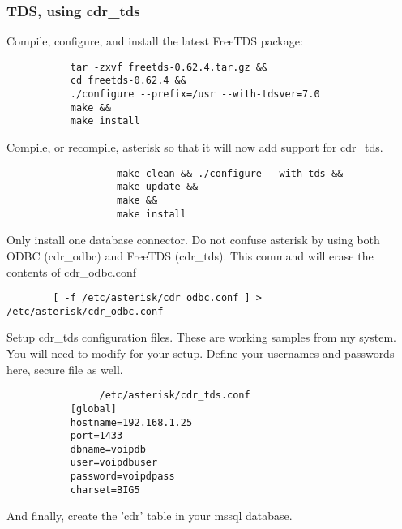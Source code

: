 \subsubsection{TDS, using cdr\_tds}
		Compile, configure, and install the latest FreeTDS package:
\begin{astlisting}
\begin{verbatim}
		   tar -zxvf freetds-0.62.4.tar.gz &&
		   cd freetds-0.62.4 &&
		   ./configure --prefix=/usr --with-tdsver=7.0
		   make &&
		   make install
\end{verbatim}
\end{astlisting}
                Compile, or recompile, asterisk so that it will now add support
                for cdr\_tds.
\begin{astlisting}
\begin{verbatim}
                   make clean && ./configure --with-tds &&
                   make update &&
                   make &&
                   make install
\end{verbatim}
\end{astlisting}
                Only install one database connector.  Do not confuse asterisk
                by using both ODBC (cdr\_odbc) and FreeTDS (cdr\_tds).
                This command will erase the contents of cdr\_odbc.conf
\begin{astlisting}
\begin{verbatim}
		[ -f /etc/asterisk/cdr_odbc.conf ] > /etc/asterisk/cdr_odbc.conf
\end{verbatim}
\end{astlisting}
                Setup cdr\_tds configuration files.  These are working samples
                from my system.  You will need to modify for your setup. Define
                your usernames and passwords here, secure file as well.
\begin{astlisting}
\begin{verbatim}
                /etc/asterisk/cdr_tds.conf
		   [global]
		   hostname=192.168.1.25
		   port=1433
		   dbname=voipdb
		   user=voipdbuser
		   password=voipdpass
		   charset=BIG5
\end{verbatim}
\end{astlisting}
                And finally, create the 'cdr' table in your mssql database.
